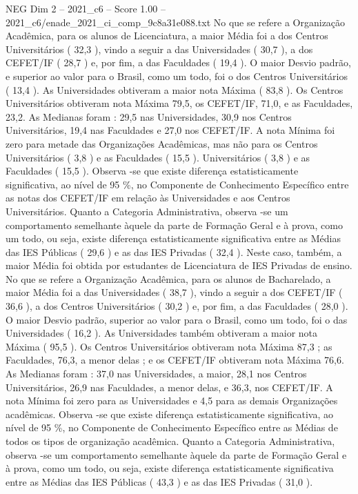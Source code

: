\begin{textsample}{NEG Dim 2 – 2021\_c6 – Score 1.00 – 2021\_c6/enade\_2021\_ci\_comp\_9c8a31e088.txt}
No que se refere a Organização Acadêmica, para os alunos de Licenciatura, a maior Média foi a dos Centros Universitários ( 32,3 ), vindo a seguir a das Universidades ( 30,7 ), a dos CEFET/IF ( 28,7 ) e, por fim, a das Faculdades ( 19,4 ).
O maior Desvio padrão, e superior ao valor para o Brasil, como um todo, foi o dos Centros Universitários ( 13,4 ).
As Universidades obtiveram a maior nota Máxima ( 83,8 ).
Os Centros Universitários obtiveram nota Máxima 79,5, os CEFET/IF, 71,0, e as Faculdades, 23,2.
As Medianas foram : 29,5 nas Universidades, 30,9 nos Centros Universitários, 19,4 nas Faculdades e 27,0 nos CEFET/IF.
A nota Mínima foi zero para metade das Organizações Acadêmicas, mas não para os Centros Universitários ( 3,8 ) e as Faculdades ( 15,5 ).
Universitários ( 3,8 ) e as Faculdades ( 15,5 ).
Observa -se que existe diferença estatisticamente significativa, ao nível de 95 \%, no Componente de Conhecimento Específico entre as notas dos CEFET/IF em relação às Universidades e aos Centros Universitários.
Quanto a Categoria Administrativa, observa -se um comportamento semelhante àquele da parte de Formação Geral e à prova, como um todo, ou seja, existe diferença estatisticamente significativa entre as Médias das IES Públicas ( 29,6 ) e as das IES Privadas ( 32,4 ).
Neste caso, também, a maior Média foi obtida por estudantes de Licenciatura de IES Privadas de ensino.
No que se refere a Organização Acadêmica, para os alunos de Bacharelado, a maior Média foi a das Universidades ( 38,7 ), vindo a seguir a dos CEFET/IF ( 36,6 ), a dos Centros Universitários ( 30,2 ) e, por fim, a das Faculdades ( 28,0 ).
O maior Desvio padrão, superior ao valor para o Brasil, como um todo, foi o das Universidades ( 16,2 ).
As Universidades também obtiveram a maior nota Máxima ( 95,5 ).
Os Centros Universitários obtiveram nota Máxima 87,3 ; as Faculdades, 76,3, a menor delas ; e os CEFET/IF obtiveram nota Máxima 76,6.
As Medianas foram : 37,0 nas Universidades, a maior, 28,1 nos Centros Universitários, 26,9 nas Faculdades, a menor delas, e 36,3, nos CEFET/IF.
A nota Mínima foi zero para as Universidades e 4,5 para as demais Organizações acadêmicas.
Observa -se que existe diferença estatisticamente significativa, ao nível de 95 \%, no Componente de Conhecimento Específico entre as Médias de todos os tipos de organização acadêmica.
Quanto a Categoria Administrativa, observa -se um comportamento semelhante àquele da parte de Formação Geral e à prova, como um todo, ou seja, existe diferença estatisticamente significativa entre as Médias das IES Públicas ( 43,3 ) e as das IES Privadas ( 31,0 ).

\end{textsample}
